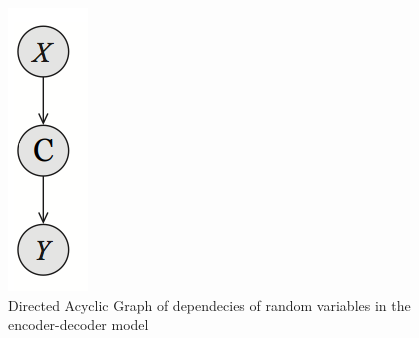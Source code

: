 \documentclass[preprint, 10pt]{elsarticle}
\begin{document}
		\begin{figure}[h]
			\centering
			\includegraphics[scale=0.4]{Imgs/BNI.png}
			\caption{Directed Acyclic Graph of dependecies of random variables in the encoder-decoder model}
			\label{fig:BNI}
		\end{figure}
		
\end{document}
